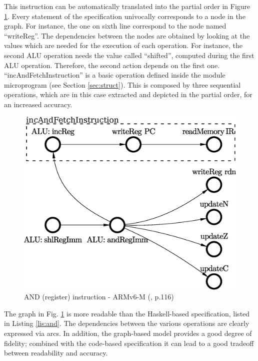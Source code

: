 \documentclass[conference]{IEEEtran}
\begin{document}
\noindent
This instruction can be automatically translated into the partial order in Figure
\ref{fig:andPO}. Every statement of the specification univocally corresponds to a node in the
graph. For instance, the one on sixth line correspond to the node named ``writeReg''.
The dependencies between the nodes are obtained by looking at the values which are needed for
the execution of each operation. For instance, the second ALU operation needs the value
called ``shifted'', computed during the first ALU operation. Therefore, the second action
depends on the first one.
``incAndFetchInstruction'' is a basic operation defined inside the module microprogram (see
Section \ref{sec:struct}). This is composed by three sequential operations, which are in this
case extracted and depicted in the partial order, for an increased accuracy.

\begin{figure}[ht!]
\begin{center}
	\includegraphics[width=\linewidth]{IMG/and_RegT1.eps}
	\caption{AND (register) instruction - ARMv6-M (\cite{armManual}, p.116)}
	\label{fig:andPO}
\end{center}
\end{figure}

The graph in Fig. \ref{fig:andPO} is more readable than the Haskell-based specification,
listed in Listing \ref{lis:and}. The dependencies between the various operations are
clearly expressed via arcs. In addition, the graph-based model provides a good degree
of fidelity; combined with the code-based specification it can lead to a good tradeoff
between readability and accuracy.
\end{document}
